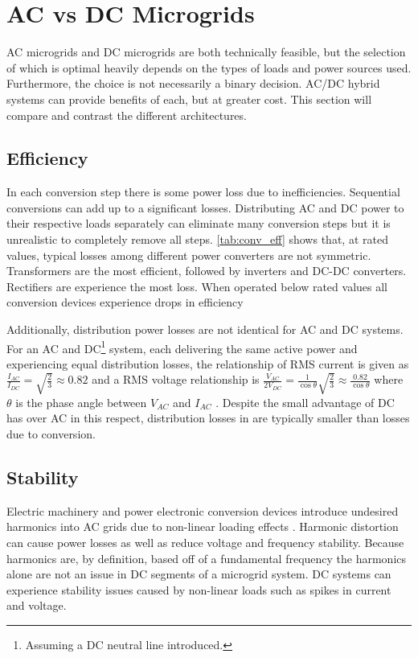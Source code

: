 
\section{AC vs DC Microgrids}
AC microgrids and DC microgrids are both technically feasible, but the selection of which is optimal heavily depends on the types of loads and power sources used. Furthermore, the choice is not necessarily a binary decision. AC\slash DC hybrid systems can provide benefits of each, but at greater cost. This section will compare and contrast the different architectures.

\subsection{Efficiency}
In each conversion step there is some power loss due to inefficiencies. Sequential conversions can add up to a significant losses. Distributing AC and DC power to their respective loads separately can eliminate many conversion steps but it is unrealistic to completely remove all steps. \autoref{tab:conv_eff} shows that, at rated values, typical losses among different power converters are not symmetric. Transformers are the most efficient, followed by inverters and DC-DC converters. Rectifiers are experience the most loss. When operated below rated values all conversion devices experience drops in efficiency

 

Additionally, distribution power losses are not identical for AC and DC systems. For an AC and DC\footnote{Assuming a DC neutral line introduced.} system, each delivering the same active power and experiencing equal distribution losses, the relationship of RMS current is given as $\frac{I_{AC}}{I_{DC}} = \sqrt{\frac{2}{3}} \approx 0.82$ and a RMS voltage relationship is $\frac{V_{AC}}{2V_{DC}} = \frac{1}{\cos{\theta}} \sqrt{\frac{2}{3}} \approx \frac{0.82}{\cos{\theta}}$ where $\theta$ is the phase angle between $V_{AC}$ and $I_{AC}$ \cite{Starke2008}. Despite the small advantage of DC has over AC in this respect, distribution losses in are typically smaller than losses due to conversion.

\subsection{Stability}
Electric machinery and power electronic conversion devices introduce undesired harmonics into AC grids due to non-linear loading effects \cite{Grotzbach1997}. Harmonic distortion can cause power losses as well as reduce voltage and frequency stability. Because harmonics are, by definition, based off of a fundamental frequency the harmonics alone are not an issue in DC segments of a microgrid system. DC systems can experience stability issues caused by non-linear loads such as spikes in current and voltage.

